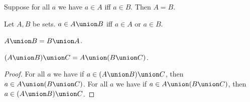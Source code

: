 \begin{axiom}[Extensionality]\label{ext}
    Suppose for all $a$ we have $a\in A$ iff $a\in B$.
    Then $A = B$.
\end{axiom}

\begin{axiom}\label{union_defn}
    Let $A, B$ be sets.
    $a\in A\union B$ iff $a\in A$ or $a\in B$.
\end{axiom}

\begin{proposition}\label{union_comm}
    $A\union B = B\union A$.
\end{proposition}

\begin{proposition}\label{union_assoc}
    $(A\union B)\union C = A\union (B\union C)$.
\end{proposition}
\begin{proof}
    For all $a$ we have if $a\in (A\union B)\union C$, then $a\in A\union (B\union C)$.
    For all $a$ we have if $a\in A\union (B\union C)$, then $a\in (A\union B)\union C$.
\end{proof}
